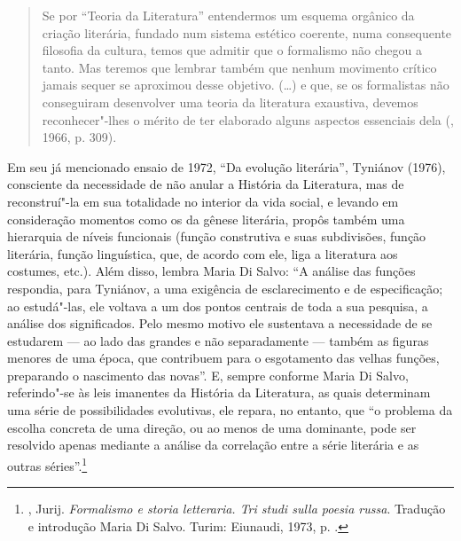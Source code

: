\begin{quotation}
Se por ``Teoria da Literatura'' entendermos um esquema orgânico da
criação literária, fundado num sistema estético coerente, numa
consequente filosofia da cultura, temos que admitir que o formalismo não
chegou a tanto. Mas teremos que lembrar também que nenhum movimento
crítico jamais sequer se aproximou desse objetivo. (\ldots{}) e que, se os
formalistas não conseguiram desenvolver uma teoria da literatura
exaustiva, devemos reconhecer"-lhes o mérito de ter elaborado alguns
aspectos essenciais dela (, 1966, p. 309).
\end{quotation}

Em seu já mencionado ensaio de 1972, ``Da evolução literária'', Tyniánov (1976),
consciente da necessidade de não anular a História da
Literatura, mas de reconstruí"-la em sua totalidade no interior da vida
social, e levando em consideração momentos como os da gênese literária,
propôs também uma hierarquia de níveis funcionais (função construtiva e
suas subdivisões, função literária, função linguística, que, de acordo
com ele, liga a literatura aos costumes, etc.). Além disso, lembra Maria Di
Salvo: ``A análise das funções respondia, para Tyniánov, a
uma exigência de esclarecimento e de especificação; ao estudá"-las, ele
voltava a um dos pontos centrais de toda a sua pesquisa, a análise dos
significados. Pelo mesmo motivo ele sustentava a necessidade de se
estudarem --- ao lado das grandes e não separadamente --- também as figuras
menores de uma época, que contribuem para o esgotamento das velhas
funções, preparando o nascimento das novas''. E, sempre conforme Maria Di Salvo,
referindo"-se às leis imanentes da História da Literatura, as quais determinam
uma série de possibilidades evolutivas, ele repara, no entanto, que ``o
problema da escolha concreta de uma direção, ou ao menos de uma
dominante, pode ser resolvido apenas mediante a análise da correlação
entre a série literária e as outras séries''.\footnote{, Jurij. \emph{Formalismo e
 storia letteraria. Tri studi sulla poesia russa}. Tradução e introdução Maria Di Salvo. Turim: Eiunaudi, 1973, p. .}


